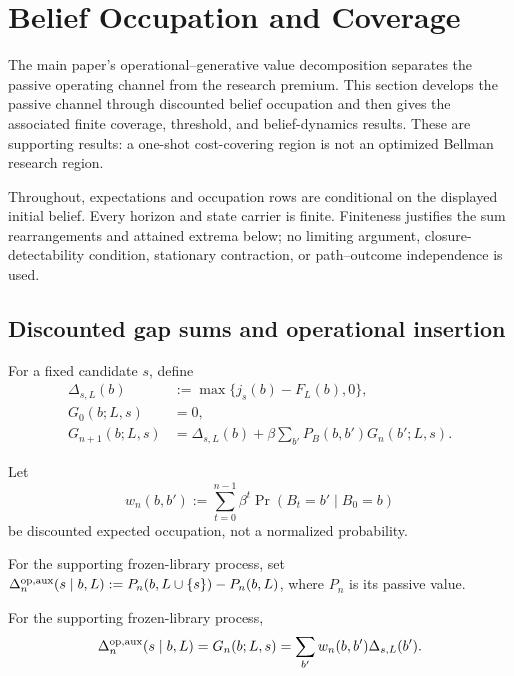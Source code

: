 \section{Belief Occupation and Coverage}
\label{supp:belief-occupation-coverage}
\label{app:coverage-details}\label{sec:coverage}\label{app:proofs-coverage}

The main paper's operational--generative value decomposition separates the
passive operating channel from the research premium.  This section develops
the passive channel through discounted belief occupation and then gives the
associated finite coverage, threshold, and belief-dynamics results.  These
are supporting results: a one-shot cost-covering region is not an optimized
Bellman research region.

Throughout, expectations and occupation rows are conditional on the displayed
initial belief.  Every horizon and state carrier is finite.  Finiteness
justifies the sum rearrangements and attained extrema below; no limiting
argument, closure-detectability condition, stationary contraction, or
path--outcome independence is used.

\subsection{Discounted gap sums and operational insertion}

\begin{definition}
\label{def:frontier-gap-sum}
For a fixed candidate \(s\), define
\begin{align}
 \Delta_{s,L}(b)&:=\max\{j_s(b)-F_L(b),0\},\nonumber\\
 G_0(b;L,s)&=0,\nonumber\\
 G_{n+1}(b;L,s)&=\Delta_{s,L}(b)
 +\beta\sum_{b'}P_B(b,b')G_n(b';L,s).
 \label{eq:discounted-gap-recursion}
\end{align}
\end{definition}
Let
\[
 w_n(b,b'):=\sum_{t=0}^{n-1}\beta^t
   \Pr(B_t=b'\mid B_0=b)
\]
be discounted expected occupation, not a normalized probability.

For the supporting frozen-library process, set
\(\Delta_n^{\mathrm{op},\mathrm{aux}}(s\mid b,L)
:=P_n(b,L\cup\{s\})-P_n(b,L)\), where \(P_n\) is its passive value.

\begin{proposition}
\label{thm:passive-innovation-equation}
For the supporting frozen-library process,
\begin{equation}\label{eq:passive-innovation-equation}
 \Delta_n^{\mathrm{op},\mathrm{aux}}(s\mid b,L)
 =G_n(b;L,s)
 =\sum_{b'}w_n(b,b')\Delta_{s,L}(b').
\end{equation}
\end{proposition}

